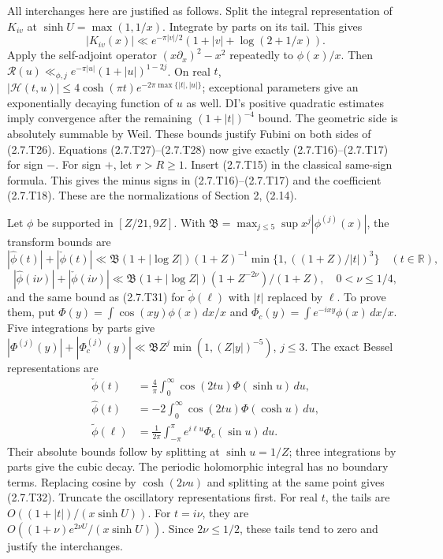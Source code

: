 All interchanges here are justified as follows. Split the integral representation of $K_{iv}$ at $\sinh U=\max(1,1/x)$. Integrate by parts on its tail. This gives
\[
|K_{iv}(x)|\ll e^{-\pi|v|/2}
                    (1+|v|+\log(2+1/x)).
\tag{2.7.T30}\label{p1:eq:2.7.T30}
\]
Apply the self-adjoint operator $(x\partial_x)^2-x^2$ repeatedly to $\phi(x)/x$. Then
$\mathcal R(u)\ll_{\phi,j}e^{-\pi|u|}(1+|u|)^{1-2j}$.
On real $t$, $|\mathcal H(t,u)|\le
4\cosh(\pi t)e^{-2\pi\max\{|t|,|u|\}}$; exceptional parameters
give an exponentially decaying function of $u$ as well.
DI's positive quadratic estimates imply convergence after the
remaining $(1+|t|)^{-4}$ bound. The geometric side is absolutely
summable by Weil. These bounds justify Fubini on both sides of
(2.7.T26). Equations (2.7.T27)--(2.7.T28) now give exactly
(2.7.T16)--(2.7.T17) for sign $-$. For sign $+$, let $r>R\ge1$. Insert (2.7.T15) in the classical same-sign formula. This gives the minus signs in (2.7.T16)--(2.7.T17) and the coefficient (2.7.T18). These are the
normalizations of Section 2, (2.14).

Let $\phi$ be supported in $[Z/21,9Z]$. With $\mathfrak B=\max_{j\le5}\sup x^j|\phi^{(j)}(x)|$, the transform bounds are
\[
|\widehat\phi(t)|+|\check\phi(t)|
 \ll\mathfrak B(1+|\log Z|)(1+Z)^{-1}
       \min\{1,((1+Z)/|t|)^3\}\quad(t\in\mathbb R),
\tag{2.7.T31}\label{p1:eq:2.7.T31}
\]
\[
|\widehat\phi(i\nu)|+|\check\phi(i\nu)|
 \ll\mathfrak B(1+|\log Z|)(1+Z^{-{2\nu}})/(1+Z),
\quad0<\nu\le1/4,
\tag{2.7.T32}\label{p1:eq:2.7.T32}
\]
and the same bound as (2.7.T31) for $\widetilde\phi(\ell)$ with
$|t|$ replaced by $\ell$. To prove them, put
$\Phi(y)=\int\cos(xy)\phi(x)\,dx/x$ and
$\Phi_c(y)=\int e^{-ixy}\phi(x)\,dx/x$.
Five integrations by parts give
$|\Phi^{(j)}(y)|+|\Phi_c^{(j)}(y)|
\ll\mathfrak B Z^j\min(1,(Z|y|)^{-5})$, $j\le3$.
The exact Bessel representations are
\[
\begin{aligned}
\check\phi(t)&=\frac4\pi\int_0^\infty
  \cos(2tu)\Phi(\sinh u)\,du,\\
\widehat\phi(t)&=-2\int_0^\infty
  \cos(2tu)\Phi(\cosh u)\,du,\\
\widetilde\phi(\ell)&=\frac1{2\pi}\int_{-\pi}^{\pi}
  e^{i\ell u}\Phi_c(\sin u)\,du.
\end{aligned}
\]
Their absolute bounds follow by splitting at $\sinh u=1/Z$;
three integrations by parts give the cubic decay. The periodic
holomorphic integral has no boundary terms. Replacing cosine by
$\cosh(2\nu u)$ and splitting at the same point gives (2.7.T32).
Truncate the oscillatory representations first. For real $t$, the
tails are $O((1+|t|)/(x\sinh U))$. For $t=i\nu$, they are
$O((1+\nu)e^{2\nu U}/(x\sinh U))$. Since $2\nu\le1/2$, these
tails tend to zero and justify the interchanges.

